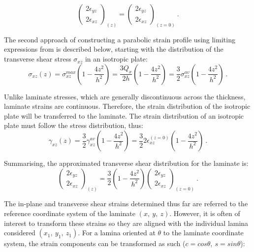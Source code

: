 \begin{equation} 
\begin{pmatrix}
2\epsilon_{yz} \\
2\epsilon_{xz}
\end{pmatrix}_{(z)}
=
\begin{pmatrix}
2\epsilon_{yz} \\
2\epsilon_{xz}
\end{pmatrix}_{(z=0)}
\label{eqscomp_strain_recovery3}\ .
\end{equation}

The second approach of constructing a parabolic strain profile using limiting expressions from \cite{FelippaKirchhoff2017} is described below, starting with the distribution of the transverse shear stress $\sigma_{xz}$ in an isotropic plate:
\begin{equation} 
\sigma_{xz} (z) = \sigma_{xz}^{max} (1-\frac{4z^2}{h^2})  = \frac{3Q_x}{2h} (1-\frac{4z^2}{h^2}) = \frac{3}{2} \sigma_{xz}^{av} (1-\frac{4z^2}{h^2})
\label{eqscomp_strain_recovery4}\ .
\end{equation}

Unlike laminate stresses, which are generally discontinuous across the thickness, laminate strains are continuous. Therefore, the strain distribution of the isotropic plate will be transferred to the laminate.
The strain distribution of an isotropic plate must follow the stress distribution, thus:
\begin{equation} 
\gamma_{xz} (z)=  \frac{3}{2} \gamma_{xz}^{av} (1-\frac{4z^2}{h^2}) = \frac{3}{2} 2\epsilon_{xz}^{(z=0)} (1-\frac{4z^2}{h^2})
\label{eqscomp_strain_recovery5}\ .
\end{equation}

Summarising, the approximated transverse shear distribution for the laminate is:
\begin{equation} 
\begin{pmatrix}
2\epsilon_{yz} \\
2\epsilon_{xz}
\end{pmatrix}_{(z)}
=
\frac{3}{2} (1-\frac{4z^2}{h^2})
\begin{pmatrix}
2\epsilon_{yz} \\
2\epsilon_{xz}
\end{pmatrix}_{(z=0)}
\label{eqscomp_strain_recovery6}\ .
\end{equation}

The in-plane and transverse shear strains determined thus far are referred to the reference coordinate system of the laminate $(x,\ y,\ z)$. However, it is often of interest to transform these strains so they are aligned with the individual lamina considered $(x_1,\ y_1,\ z_1)$. For a lamina oriented at $\theta$ to the laminate coordinate system, the strain components can be transformed as such ($c = cos\theta,\ s = sin\theta$):

